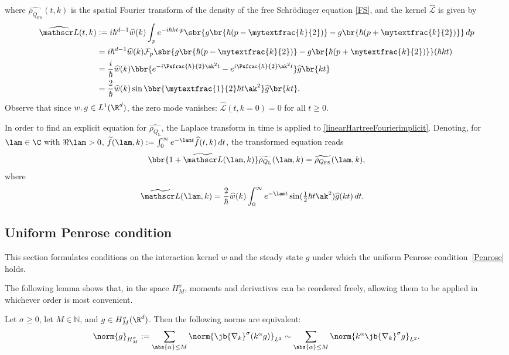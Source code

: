 where $\widehat{\rho_{{Q_{\mathrm{FS}}}}}(t,k)$ is the spatial Fourier transform of the density of the free Schrödinger equation \eqref{FS}, and the kernel $\widehat {\mathscr L}$ is given by\vspace*{-3pt}
\begin{align*}
\widehat {\mathscr L}(t,k)&:= i\hbar^{d-1}\widehat w(k)\int_p e^{-i\hbar kt\cdot p}\sbr{g\br{\hbar (p-\mytextfrac{k}{2})}-g\br{\hbar (p+\mytextfrac{k}{2})}}\,dp\\
&= i\hbar^{d-1}\widehat w(k)\mathcal F_p\sbr{g\br{\hbar (p-\mytextfrac{k}{2})}-g\br{\hbar (p+\mytextfrac{k}{2})}}(\hbar kt)\\
&= \frac{i}{\hbar}\widehat w(k)\bbr{e^{-i\Psfrac{\hbar}{2} \ak^2 t}-e^{i\Psfrac{\hbar}{2} \ak^2 t}}\widehat g\br{kt}\\
&=\frac{2}{\hbar}\widehat w(k)\sin\bbr{\mytextfrac{1}{2} \hbar t\ak^2}\widehat g\br{kt}.
\end{align*}Observe that since $w,g\in L^1(\R^d)$, the zero mode vanishes: $\widehat {\mathscr L}(t,k=0)=0$ for all $t\geq0$.

In order to find an explicit equation for $\widehat{\rho_{Q_{\mathrm{L}}}}$, the Laplace transform in time is applied to \eqref{linearHartreeFourierimplicit}. Denoting, for $\lam\in\C$ with $\Re\lam>0$, $\widetilde f(\lam,k):=\int_0^\infty e^{-\lam t}\widehat f(t,k)\,dt$, the transformed equation reads
\begin{align}\label{beforedivision}
\bbr{1+\widetilde {\mathscr L}(\lam,k)}\widetilde{\rho_{Q_{\mathrm{L}}}}(\lam,k)=\widetilde{\rho_{{Q_{\mathrm{FS}}}}}(\lam,k),
\end{align}where\begin{align}\label{firstL}
\widetilde {\mathscr L}(\lam,k)&=\frac{2}{\hbar}\widehat w(k)\int_0^\infty e^{-\lam t}\sin(\tfrac{1}{2}\hbar t\ak^2)\widehat g(kt)\,dt.\end{align}

\subsection{Uniform Penrose condition}\label{Penroseconditionsection}
This section formulates conditions on the interaction kernel \( w \) and the steady state \( g \) under which the uniform Penrose condition~\eqref{Penrose} holds.

The following lemma shows that, in the space $H^\sigma_M$, moments and derivatives can be reordered freely, allowing them to be applied in whichever order is most convenient.
\begin{lemma}\label{lemmaHMnorm}
Let $\sigma\geq0$, let $M\in\mathbb N$, and $g\in H^\sigma_M(\R^d)$. Then the following norms are equivalent:
\begin{align*}
\norm{g}_{H^\sigma_M}:=\sum_{\abs{\alpha}\leq M}\norm{\jb{\nabla_{k}}^\sigma (k^\alpha g)}_{L^2}\sim\sum_{\abs{\alpha}\leq M}\norm{k^\alpha\jb{\nabla_{k}}^\sigma g}_{L^2}.
\end{align*}
\end{lemma}

